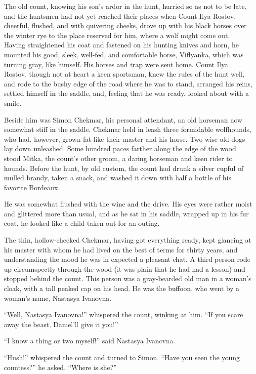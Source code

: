 The old count, knowing his son's ardor in the hunt, hurried so as
not to be late, and the huntsmen had not yet reached their places
when Count Ilya Rostov, cheerful, flushed, and with quivering
cheeks, drove up with his black horses over the winter rye to the
place reserved for him, where a wolf might come out. Having
straightened his coat and fastened on his hunting knives and
horn, he mounted his good, sleek, well-fed, and comfortable
horse, Viflyanka, which was turning gray, like himself.  His
horses and trap were sent home. Count Ilya Rostov, though not at
heart a keen sportsman, knew the rules of the hunt well, and rode
to the bushy edge of the road where he was to stand, arranged his
reins, settled himself in the saddle, and, feeling that he was
ready, looked about with a smile.

Beside him was Simon Chekmar, his personal attendant, an old
horseman now somewhat stiff in the saddle. Chekmar held in leash
three formidable wolfhounds, who had, however, grown fat like
their master and his horse.  Two wise old dogs lay down
unleashed. Some hundred paces farther along the edge of the wood
stood Mitka, the count's other groom, a daring horseman and keen
rider to hounds. Before the hunt, by old custom, the count had
drunk a silver cupful of mulled brandy, taken a snack, and washed
it down with half a bottle of his favorite Bordeaux.

He was somewhat flushed with the wine and the drive. His eyes
were rather moist and glittered more than usual, and as he sat in
his saddle, wrapped up in his fur coat, he looked like a child
taken out for an outing.

The thin, hollow-cheeked Chekmar, having got everything ready,
kept glancing at his master with whom he had lived on the best of
terms for thirty years, and understanding the mood he was in
expected a pleasant chat. A third person rode up circumspectly
through the wood (it was plain that he had had a lesson) and
stopped behind the count. This person was a gray-bearded old man
in a woman's cloak, with a tall peaked cap on his head. He was
the buffoon, who went by a woman's name, Nastasya Ivanovna.

``Well, Nastasya Ivanovna!'' whispered the count, winking at
him. ``If you scare away the beast, Daniel'll give it you!''

``I know a thing or two myself!'' said Nastasya Ivanovna.

``Hush!'' whispered the count and turned to Simon. ``Have you
seen the young countess?'' he asked. ``Where is she?''

